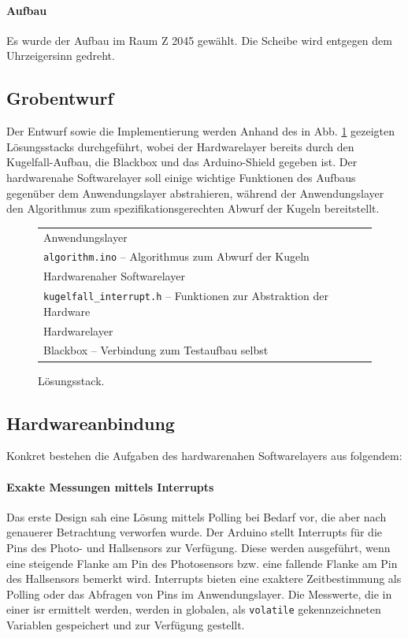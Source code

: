 \documentclass{kis}
\begin{document}
\paragraph{Aufbau}
Es wurde der Aufbau im Raum Z 2045 gewählt. Die Scheibe wird entgegen dem Uhrzeigersinn gedreht.

\subsection{Grobentwurf}
Der Entwurf sowie die Implementierung werden Anhand des in Abb. \ref{fig:lösungsstack} gezeigten Lösungsstacks durchgeführt, wobei der Hardwarelayer bereits durch den Kugelfall-Aufbau, die Blackbox und das Arduino-Shield gegeben ist. Der hardwarenahe Softwarelayer soll einige wichtige Funktionen des Aufbaus gegenüber dem Anwendungslayer abstrahieren, während der Anwendungslayer den Algorithmus zum spezifikationsgerechten Abwurf der Kugeln bereitstellt.

\begin{figure}
	\centering
	\renewcommand{\arraystretch}{1.7}
	\begin{tabularx}{0.8\textwidth}{|Y|}
		\hline
		\large Anwendungslayer\\
		\small \texttt{algorithm.ino} -- Algorithmus zum Abwurf der Kugeln\\
		\hline
		\large Hardwarenaher Softwarelayer\\
		\small \texttt{kugelfall\_interrupt.h} -- Funktionen zur Abstraktion der Hardware\\
		\hline
		\large Hardwarelayer\\
		\small Blackbox -- Verbindung zum Testaufbau selbst\\
		\hline
	\end{tabularx}
	\caption{Lösungsstack.}
	\label{fig:lösungsstack}
\end{figure}

\subsection{Hardwareanbindung}
Konkret bestehen die Aufgaben des hardwarenahen Softwarelayers aus folgendem:

\paragraph{Exakte Messungen mittels Interrupts}
Das erste Design sah eine Lösung mittels Polling bei Bedarf vor, die aber nach genauerer Betrachtung verworfen wurde. Der Arduino stellt Interrupts für die Pins des Photo- und Hallsensors zur Verfügung. Diese werden ausgeführt, wenn eine steigende Flanke am Pin des Photosensors bzw. eine fallende Flanke am Pin des Hallsensors bemerkt wird. Interrupts bieten eine exaktere Zeitbestimmung als Polling oder das Abfragen von Pins im Anwendungslayer. Die Messwerte, die in einer \gls{isr} ermittelt werden, werden in globalen, als \texttt{volatile} gekennzeichneten Variablen gespeichert und zur Verfügung gestellt.
\end{document}
